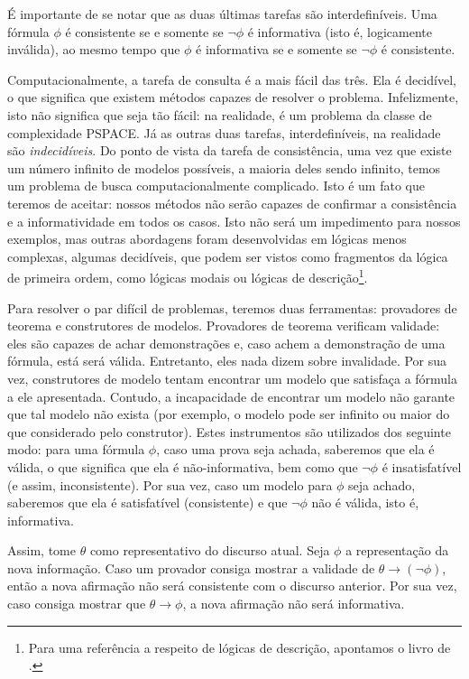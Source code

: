 	É importante de se notar que as duas últimas tarefas são interdefiníveis. Uma fórmula $\phi$ é consistente se e somente se $\neg \phi$ é informativa (isto é, logicamente inválida), ao mesmo tempo que $\phi$ é informativa se e somente se $\neg \phi$ é consistente.
	
	Computacionalmente, a tarefa de consulta é a mais fácil das três. Ela é decidível, o que significa que existem métodos capazes de resolver o problema. Infelizmente, isto não significa que seja tão fácil: na realidade, é um problema da classe de complexidade PSPACE.  Já as outras duas tarefas, interdefiníveis, na realidade são \textit{indecidíveis}. Do ponto de vista da tarefa de consistência, uma vez que existe um número infinito de modelos possíveis, a maioria deles sendo infinito, temos um problema de busca computacionalmente complicado. \citep[pp.~50--54]{BlackburnBos:2005} Isto é um fato que teremos de aceitar: nossos métodos não serão capazes de confirmar a consistência e a informatividade em todos os casos. Isto não será um impedimento para nossos exemplos, mas outras abordagens foram desenvolvidas em lógicas menos complexas, algumas decidíveis, que podem ser vistos como fragmentos da lógica de primeira ordem, como lógicas modais ou lógicas de descrição\footnote{Para uma referência a respeito de lógicas de descrição, apontamos o livro de \citet{description-logic}.}.
	
	Para resolver o par difícil de problemas, teremos duas ferramentas: provadores de teorema e construtores de modelos. Provadores de teorema verificam validade: eles são capazes de achar demonstrações e, caso achem a demonstração de uma fórmula, está será válida. Entretanto, eles nada dizem sobre invalidade. Por sua vez, construtores de modelo tentam encontrar um modelo que satisfaça a fórmula a ele apresentada. Contudo, a incapacidade de encontrar um modelo não garante que tal modelo não exista (por exemplo, o modelo pode ser infinito ou maior do que considerado pelo construtor).
		Estes instrumentos são utilizados dos seguinte modo: para uma fórmula $\phi$, caso uma prova seja achada, saberemos que ela é válida, o que significa que ela é não-informativa, bem como que $\neg \phi$ é insatisfatível (e assim, inconsistente). Por sua vez, caso um modelo para $\phi$ seja achado, saberemos que ela é satisfatível (consistente) e que $\neg \phi$ não é válida, isto é, informativa.
		
		Assim, tome $\theta$ como representativo do discurso atual. Seja $\phi$ a representação da nova informação. Caso um provador consiga mostrar a validade de $\theta \rightarrow (\neg \phi)$, então a nova afirmação não será consistente com o discurso anterior. Por sua vez, caso consiga mostrar que $\theta \rightarrow \phi$, a nova afirmação não será informativa.
		
